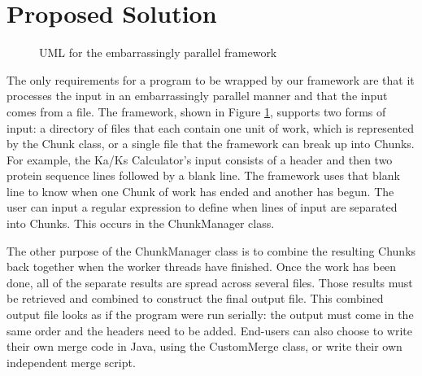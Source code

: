 \documentclass[12pt]{article}
\begin{document}
\section{Proposed Solution}
\begin{figure}
    \begin{center}
    \end{center}
    \caption{UML for the embarrassingly parallel framework}
    \label{fig:uml}
\end{figure}

The only requirements for a program to be wrapped by our framework are that it
processes the input in an embarrassingly parallel manner and that the input
comes from a file. The framework, shown in Figure \ref{fig:uml}, supports two
forms of input: a directory of files that each contain one unit of work, which
is represented by the Chunk class, or a single file that the framework can break
up into Chunks. For example, the Ka/Ks Calculator's input consists of a header
and then two protein sequence lines followed by a blank line. The framework uses
that blank line to know when one Chunk of work has ended and another has begun.
The user can input a regular expression to define when lines of input are
separated into Chunks. This occurs in the ChunkManager class. 

The other purpose of the ChunkManager class is to combine the resulting Chunks
back together when the worker threads have finished. Once the work has been
done, all of the separate results are spread across several files. Those results
must be retrieved and combined to construct the final output file. This combined
output file looks as if the program were run serially: the output must come in
the same order and the headers need to be added. End-users can also choose to
write their own merge code in Java, using the CustomMerge class, or write their
own independent merge script. 
\end{document}
